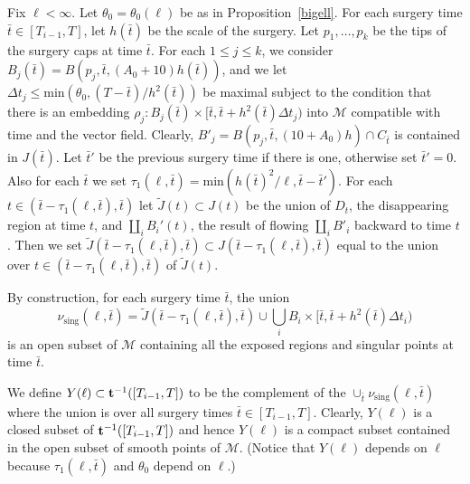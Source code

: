 \begin{definition}
\label{def:compact-subset-Y-ell}
Fix $\ell<\infty$. Let $\theta_0=\theta_0(\ell)$ be as in
Proposition~\ref{bigell}. For each surgery time $\bar t\in
[T_{i-1},T]$, let $h(\bar t)$ be the scale of the surgery.
 Let $p_1,\ldots,p_k$ be
the tips of the surgery caps at time $\bar t$. For each $1\le j\le k$,
we consider $B_j(\bar
t)=B(p_j,\bar t,(A_0+10)h(\bar t))$, and we let $\Delta t_j\le \mathrm{min}(\theta_0,(T-\bar t)/h^2(\bar t))$ be maximal subject to the condition that
there is an embedding $\rho_j\colon B_j(\bar t)\times [\bar t,\bar t+h^2(\bar
t)\Delta t_j)$ into ${\mathcal M}$ compatible with time and the vector field.
Clearly, $B'_j=B(p_j,\bar t,(10+A_0)h)\cap C_{\bar t}$ is contained in $J(\bar
t)$. Let $\bar t'$ be the previous surgery time if there is one, otherwise set
$\bar t'=0$. Also for each $\bar t$ we set $\tau_1(\ell,\bar t)=\mathrm{min}\left(h(\bar t)^2/\ell,\bar t-\bar t'\right)$. For each $t\in (\bar
t-\tau_1(\ell,\bar t),\bar t)$ let $\widetilde J(t)\subset J(t)$ be the union
of $D_t$, the disappearing region at time $t$, and $\coprod_iB_i'(t)$,  the
result of flowing $\coprod_iB'_i$ backward to time $t$. Then we set
$\widetilde J(\bar t-\tau_1(\ell,\bar t),\bar t)\subset J(\bar
t-\tau_1(\ell,\bar t),\bar t)$ equal to the union over $t\in (\bar
t-\tau_1(\ell,\bar t),\bar t)$ of $\widetilde J(t)$.





 By construction,
for each surgery time $\bar t$, the union  $$\nu_\mathrm{sing}(\ell,\bar
t)=\widetilde J(\bar t-\tau_1(\ell,\bar t),\bar t)\cup\bigcup
_iB_i\times [\bar t,\bar t+h^2(\bar t)\Delta t_i)$$ is an open
subset of ${\mathcal M}$ containing all the exposed regions and
singular points at time $\bar t$.

We define $Y(\ell )\subset {\bf t}^{-1}([T_{i-1},T])$ to be the
complement of the $\cup_{\bar t}\nu_\mathrm{sing}(\ell,\bar t)$ where
the union is over all surgery times $\bar t\in [T_{i-1},T]$.
Clearly, $Y(\ell )$ is a closed subset of ${\bf
t}^{-1}([T_{i-1},T])$ and hence $Y(\ell )$ is a compact subset
contained in the open subset of smooth points of ${\mathcal M}$.
(Notice that $Y(\ell )$ depends on $\ell $ because $\tau_1(\ell,\bar
t)$ and $\theta_0$ depend on $\ell$.)
\end{definition}


